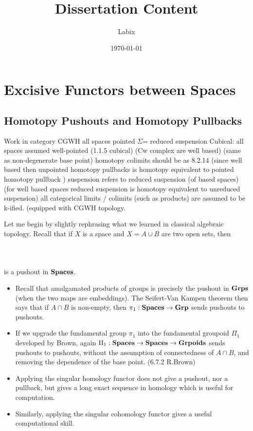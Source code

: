 \documentclass[a4paper]{article}
\title{Dissertation Content}
\author{Labix}
\date{\today}
\begin{document}
\maketitle
\begin{abstract}
\end{abstract}

\pagebreak
\tableofcontents

\pagebreak
\section{Excisive Functors between Spaces}
\subsection{Homotopy Pushouts and Homotopy Pullbacks}
Work in category CGWH
all spaces pointed
$\Sigma$= reduced suspension
Cubical: all spaces assumed well-pointed (1.1.5 cubical) (Cw complex are well based) (same as non-degenerate base point)
homotopy colimits should be as 8.2.14 (since well based then unpointed homotopy pullbacks is homotopy equivalent to pointed homotopy pullback )
suspension refers to reduced suspension (of based spaces) (for well based spaces reduced suspension is homotopy equivalent to unreduced suspension)
all categorical limits / colimits (such as products) are assumed to be k-ified. (equipped with CGWH topology. 

Let me begin by slightly rephrasing what we learned in classical algebraic topology. Recall that if $X$ is a space and $X=A\cup B$ are two open sets, then \\~\\
\\~\\
is a pushout in $\bold{Spaces}$. 
\begin{itemize}
\item Recall that amalgamated products of groups is precisely the pushout in $\bold{Grps}$ (when the two maps are embeddings). The Seifert-Van Kampen theorem then says that if $A\cap B$ is non-empty, then $\pi_1:\bold{Spaces}\to\bold{Grp}$ sends pushouts to pushouts. 
\item If we upgrade the fundamental group $\pi_1$ into the fundamental groupoid $\Pi_1$ developed by Brown, again $\Pi_1:\bold{Spaces}\to\bold{Spaces}\to\bold{Grpoids}$ sends pushouts to pushouts, without the assumption of connectedness of $A\cap B$, and removing the dependence of the base point. (6.7.2 R.Brown)
\item Applying the singular homology functor does not give a pushout, nor a pullback, but gives a long exact sequence in homology which is useful for computation. 
\item Similarly, applying the singular cohomology functor gives a useful computational skill. 
\end{itemize}
\end{document}
